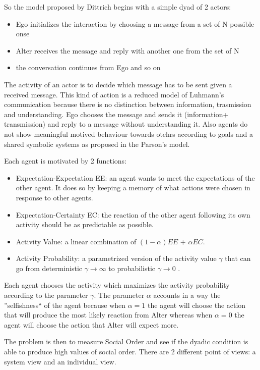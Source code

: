 \documentclass[a4paper,10pt]{article}
\begin{document}
So the model proposed by Dittrich begins with a simple dyad of 2 actors:
\begin{itemize}
 \item Ego initializes the interaction by choosing a message from a set of N possible onse
 \item Alter receives the message and reply with another one from the set of N
 \item the conversation continues from Ego and so on
\end{itemize}
The activity of an actor is to decide which message has to be sent given a received message. 
This kind of action is a reduced model of Luhmann's communication because there is no distinction between
information, trasmission and understanding.
Ego chooses the message and sends it (information+ transmission) and reply to a message without understanding it.
Also agents do not show meaningful motived behaviour towards otehrs according to goals and a shared symbolic systems as proposed in the Parson's model.

Each agent is motivated by 2 functions:
\begin{itemize}
 \item Expectation-Expectation EE: an agent wants to meet the expectations of the other agent. It does so by keeping a memory of what actions were chosen in response to other agents.
 \item Expectation-Certainty EC:  the reaction of the other agent following its own activity should be as predictable as possible.
 \item Activity Value: a linear combination of $(1 - \alpha)EE$ + $\alpha EC$.
 \item Activity Probability: a parametrized version of the activity value $\gamma$ that can go from deterministic $\gamma \rightarrow \infty$ to probabilistic $\gamma \rightarrow 0$ .
\end{itemize}
Each agent chooses the activity which maximizes the activity probability according to the parameter $\gamma$.
The parameter $\alpha$ accounts in a way the ''selfishness`` of the agent because when $\alpha=1$ the agent will choose the action that will produce the most likely reaction from Alter whereas when $\alpha=0$ the agent will choose the action that Alter will expect more.

The problem is then to measure Social Order and see if the dyadic condition is able to produce high values of social order. There are 2 different point of views: a system view and an individual view.
\end{document}
